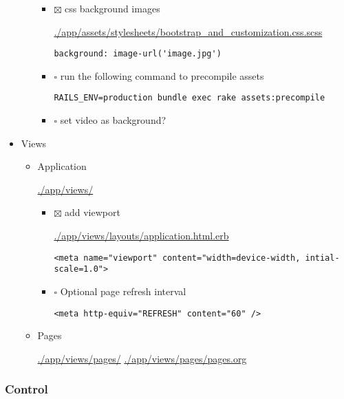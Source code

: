 \documentclass[11pt]{article}
\begin{document}
\begin{itemize}
\begin{itemize}
\begin{itemize}
\item $\boxtimes$ css background images 

\url{./app/assets/stylesheets/bootstrap_and_customization.css.scss}

\begin{verbatim}
background: image-url('image.jpg')
\end{verbatim}

\item $\square$ run the following command to precompile assets

\begin{verbatim}
RAILS_ENV=production bundle exec rake assets:precompile
\end{verbatim}

\item $\square$ set video as background?
\end{itemize}
\end{itemize}


\item Views
\label{sec-1-3-2-4}

\begin{itemize}
\item Application
\label{sec-1-3-2-4-1}

\url{./app/views/}

\begin{itemize}
\item $\boxtimes$ add viewport

\url{./app/views/layouts/application.html.erb}

\begin{verbatim}
<meta name="viewport" content="width=device-width, intial-scale=1.0">
\end{verbatim}

\item $\square$ Optional page refresh interval

\begin{verbatim}
<meta http-equiv="REFRESH" content="60" />
\end{verbatim}
\end{itemize}

\item Pages
\label{sec-1-3-2-4-2}

\url{./app/views/pages/}
\url{./app/views/pages/pages.org}
\end{itemize}
\end{itemize}

\subsubsection*{Control}
\label{sec-1-3-3}
\end{document}
